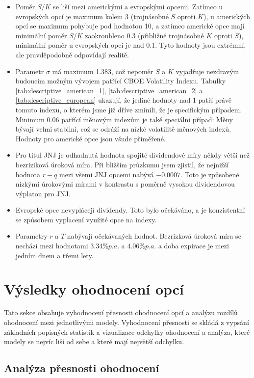 \documentclass[male,czech,api_bc]{kitheses}
\begin{document}
  \begin{itemize}
    \item{Poměr $S/K$ se liší mezi americkými a evropskými opcemi. Zatímco u evropských opcí je maximum kolem 3 (trojnásobné $S$ oproti $K$), u amerických opcí se maximum pohybuje pod hodnotou 10, a zatímco americké opce mají minimální poměr $S/K$ zaokrouhleno 0.3 (přibližně trojnásobné $K$ oproti $S$), minimální poměr u evropských opcí je nad 0.1. Tyto hodnoty jsou extrémní, ale pravděpodobně odpovídají realitě.}
    \item{Parametr $\sigma$ má maximum 1.383, což nepoměr $S$ a $K$ vyjadřuje nezdravým budoucím možným vývojem patřící CBOE Volatility Indexu. Tabulky \ref{tab:descriptive_american_1}, \ref{tab:descriptive_american_2} a \ref{tab:descriptive_european} ukazují, že jediné hodnoty nad 1 patří právě tomuto indexu, o kterém jsme již dříve zmínili, že je specifickým případem. Minimum 0.06 patřící měnovým indexům je také speciální případ: Měny bývají velmi stabilní, což se odráží na nízké volatilitě měnových indexů. Hodnoty pro americké opce jsou všude přiměřené.}
    \item{Pro titul JNJ je odhadnutá hodnota spojité dividendové míry někdy větší než bezriziková úroková míra. Při bližším průzkumu jsem zjistil, že nejnižší hodnota $r - q$ mezi všemi JNJ opcemi nabývá $-0.0007$. Toto je způsobené nízkými úrokovými mírami v kontrastu s poměrně vysokou dividendovou výplatou pro JNJ.}
    \item{Evropské opce nevyplácejí dividendy. Toto bylo očekáváno, a je konzistentní se způsobem vyplacení využité opce na indexy.}
    \item{Parametry $r$ a $T$ nabývají očekávaných hodnot. Bezrizková úroková míra se nechází mezi hodnotami $3.34 \% p.a.$ a $4.06 \% p.a.$ a doba expirace je mezi jedním dnem a třemi lety.}
  \end{itemize}

  \section{Výsledky ohodnocení opcí}

  Tato sekce obsahuje vyhodnocení přesnosti ohodnocení opcí a analýzu rozdílů ohodnocení mezi jednotlivými modely. Vyhodnocení přesnosti se skládá z vypsání základních popisných statistik a vizualizace odchylky ohodnocení a analýza, které modely se nejvíc liší od sebe a které mají největší odchylku.

  \subsection{Analýza přesnosti ohodnocení}
\end{document}

